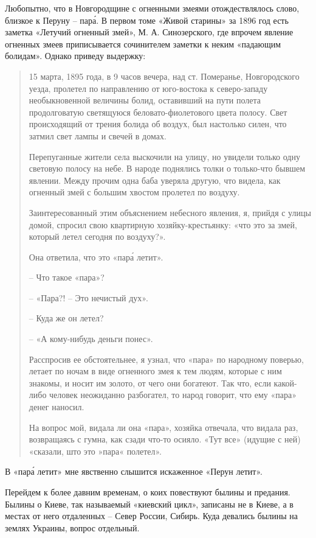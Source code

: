 Любопытно, что в Новгородщине с огненными змеями отождествлялось слово, близкое к Перуну – пар\'а. В первом томе «Живой старины» за 1896 год  есть заметка «Летучий огненный змей», М. А. Синозерского, где впрочем явление огненных змеев приписывается сочинителем заметки к неким «падающим болидам». Однако приведу выдержку:

\begin{quotation}
15 марта, 1895 года, в 9 часов вечера, над ст. Померанье, Новгородского уезда, пролетел по направлению от юго-востока к северо-западу необыкновенной величины болид, оставивший на пути полета продолговатую светящуюся беловато-фиолетового цвета полосу. Свет происходящий от трения болида об воздух, был настолько силен, что затмил свет лампы и свечей в домах.

Перепуганные жители села выскочили на улицу, но увидели только одну световую полосу на небе. В народе поднялись толки о только-что бывшем явлении. Между прочим одна баба уверяла другую, что видела, как огненный змей с большим хвостом пролетел по воздуху.

Заинтересованный этим объяснением небесного явления, я, прийдя с улицы домой, спросил свою квартирную хозяйку-крестьянку: «что это за змей, который летел сегодня по воздуху?».

Она ответила, что это «пар\'а летит».

   – Что такое «пара»?

   – «Пара?! – Это нечистый дух».

   – Куда же он летел?

   – «А кому-нибудь деньги понес».

   Расспросив ее обстоятельнее, я узнал, что «пара» по народному поверью, летает по ночам в виде огненного змея к тем людям, которые с ним знакомы, и носит им золото, от чего они богатеют. Так что, если какой-либо человек неожиданно разбогател, то народ говорит, что ему «пара» денег наносил.

На вопрос мой, видала ли она «пара», хозяйка отвечала, что видала раз, возвращаясь с гумна, как сзади что-то осияло. «Тут все» (идущие с ней) «сказали, што это »пара« полетел».
\end{quotation}
 
В «пар\'а летит» мне явственно слышится искаженное «Перун летит».
 
Перейдем к более давним временам, о коих повествуют былины и предания. Былины о Киеве, так называемый «киевский цикл», записаны не в Киеве, а в местах от него отдаленных – Север России, Сибирь. Куда девались былины на землях Украины, вопрос отдельный.
